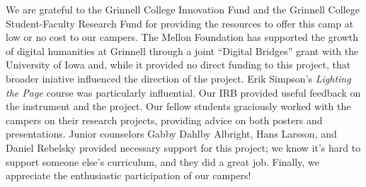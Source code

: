 \begin{acks}
{\small
We are grateful to the Grinnell College Innovation Fund and the
Grinnell College Student-Faculty Research Fund for providing the
resources to offer this camp at low or no cost to our campers.  The
Mellon Foundation has supported the growth of digital humanities
at Grinnell through a joint ``Digital Bridges'' grant with the
University of Iowa and, while it provided no direct funding to this
project, that broader iniative influenced the direction of the
project.  Erik Simpson's \textit{Lighting the Page} course was particularly
influential.  Our IRB provided useful feedback on the instrument
and the project.  Our fellow students graciously worked with the
campers on their research projects, providing advice on both posters
and presentations.  Junior counselors Gabby Dahlby Albright, Hans
Larsson, and Daniel Rebelsky provided necessary support for this
project; we know it's hard to support someone else's curriculum,
and they did a great job.  Finally, we appreciate the enthusiastic
participation of our campers!
} 
\end{acks}
